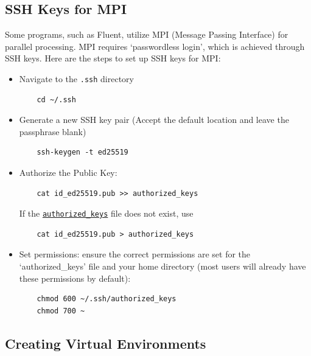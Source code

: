 \documentclass{easychair}
\begin{document}
\subsection{SSH Keys for MPI}
\label{sect:ssh-mpi}

Some programs, such as Fluent, utilize MPI (Message Passing Interface) for parallel processing. 
MPI requires `passwordless login', which is achieved through SSH keys. Here are the steps to set up SSH keys for MPI:

\begin{itemize}
	\item
	Navigate to the \texttt{.ssh} directory
	\begin{verbatim}
	cd ~/.ssh
	\end{verbatim}

	\item
	Generate a new SSH key pair (Accept the default location and leave the passphrase blank)
	\begin{verbatim}
	ssh-keygen -t ed25519
	\end{verbatim}

	\item
	Authorize the Public Key:
	\begin{verbatim}
	cat id_ed25519.pub >> authorized_keys
	\end{verbatim} 
	If the \texttt{\href{https://www.ssh.com/academy/ssh/authorized-keys-file}{authorized\_keys}} file does not exist, use
	\begin{verbatim}
	cat id_ed25519.pub > authorized_keys
	\end{verbatim}

	\item
	Set permissions: ensure the correct permissions are set for the `authorized\_keys' file and your home directory
	(most users will already have these permissions by default):
	\begin{verbatim}
	chmod 600 ~/.ssh/authorized_keys
	chmod 700 ~
	\end{verbatim}
\end{itemize}

\subsection{Creating Virtual Environments}
\label{sect:environments}
\label{sect:examples-venv}
\end{document}

